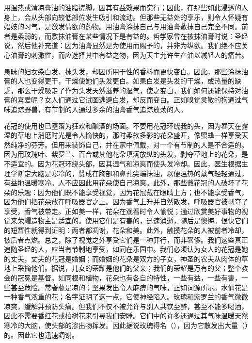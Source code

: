 \newline{}\par

用温热或清凉膏油的油脂搓脚，因其有益效果而实行；因此，在那些如此浸透的人身上，会从头部向较低部位发生吸引和流动。但那些无益处的享乐，则令人怀疑有娼妓的习气，是激发情欲的药物。用油膏涂抹自己与用油膏敷抹自己完全不同。前者是柔弱的，而敷抹油膏在某些情况下是有益的。哲学家曾在被抹油膏时说：圣经说，然后他补充道：因为油膏显然是为使用而赐予的，并非为纵欲。我们绝不应关心油膏的刺激性，而应选择其中有益之物，因为天主允许生产油以减轻人的痛苦。\par

愚昧的妇女染白发、抹头发，却因所用干性的香料而更快变白。因此，那些涂抹油膏的人也变得更干，干燥使她们头发更白。如果白发是头发的干燥，或热量的缺乏，那么干燥吸走了作为头发天然滋养的湿气，使之变白，我们如何还能保持对油膏的喜爱呢？女人们通过它试图逃避白发，却反而变白。正如嗅觉灵敏的狗通过气味追踪野兽，有节制的人通过多余的油膏香气追踪放荡的人。\par

花冠的使用也已堕落为狂欢和酗酒的场面。不要用花冠环绕我的头，因为春天在露湿的草地上消磨时光是令人愉快的，那时柔软多彩的花朵盛开，像蜜蜂一样享受天然纯净的芬芳。但用来装饰自己，并在家中佩戴，对一个有节制的人是不合适的。因为用玫瑰叶、紫罗兰、百合或其他花朵填满放纵的头发，剥夺草地上的花朵，是不适宜的。因为花冠环绕头部，因其湿气和凉爽而使头发冷却。因此，医生根据生理学断定大脑是寒冷的，赞成在胸部和鼻孔尖端抹油，以便温热的蒸气轻轻通过，有益地温暖寒冷。人不应因此用花朵使自己凉爽。此外，那些戴花冠的人破坏了花朵的乐趣：因为他们既不能享受视觉，因为花冠戴在眼睛上方；也不能享受香气，因为他们把花朵放在呼吸器官之上。因为香气上升并自然散发，呼吸器官被剥夺了享受，香气被带走。正如美一样，花朵在观看时令人愉悦；通过欣赏美好事物的视觉来荣耀造物主是适宜的。使用它们是有害的，迅速消逝，随后是懊悔。很快它们的短暂性就得到证明：两者都凋谢，花朵和美。此外，触摸花朵的人被前者冷却，被后者点燃。总之，除了视觉之外享受它们是一种罪行，而非奢侈。我们这些真正追随圣经的人，应当有节制地享受，如同在乐园中。我们必须认为女人的花冠是她的丈夫，丈夫的花冠是婚姻；而婚姻的花朵是双方的子女，神圣的农夫从肉体的草地上采摘他们。据说，儿女的荣耀是他们的父亲；我们的荣耀是万有的父；整个教会的冠冕是基督。如同根和植物，花朵也有各自的特性，一些有益，一些有害，一些甚至危险。常春藤是凉的；坚果发出令人麻痹的气味，正如词源所示。水仙花是一种香气浓重的花；名字证明了这一点，它使神经陷入。玫瑰和紫罗兰的香气微微凉爽，缓解并预防头痛。但我们不仅不被允许与别人共饮至醉，甚至不能多喝酒，因此不需要番红花或柏树花来引导我们安睡。它们中的许多还通过其气味温暖天然寒冷的大脑，使头部的渗出物挥发。因此据说玫瑰得名（），因为它散发出大量（）的。因此它也迅速凋谢。\par

